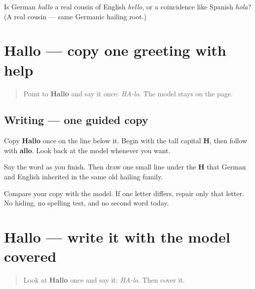 \begin{tcolorbox}[breakable,colback=teal!4,colframe=teal!35!black,title={Before you move on}]
Is German \emph{hallo} a real cousin of English \emph{hello}, or a coincidence like Spanish \emph{hola}? (A real cousin — same Germanic hailing root.)
\end{tcolorbox}
\section[Hallo]{Hallo — copy one greeting with help}

\label{lesson:GE-W01-hallo-guided-copy}



\begin{quote}
Point to \textbf{Hallo} and say it once: \emph{HA-lo}. The model stays on the page.
\end{quote}

\subsection*{Writing — one guided copy}

Copy \textbf{Hallo} once on the line below it. Begin with the tall capital \textbf{H}, then follow with \textbf{allo}. Look back at the model whenever you want.

Say the word as you finish. Then draw one small line under the \textbf{H} that German and English inherited in the same old hailing family.

\begin{tcolorbox}[breakable,colback=teal!4,colframe=teal!35!black,title={Before you move on}]
Compare your copy with the model. If one letter differs, repair only that letter. No hiding, no spelling test, and no second word today.
\end{tcolorbox}
\section[Hallo]{Hallo — write it with the model covered}

\label{lesson:GE-W01-hallo-delayed-copy}



\begin{quote}
Look at \textbf{Hallo} once and say it: \emph{HA-lo}. Then cover it.
\end{quote}

